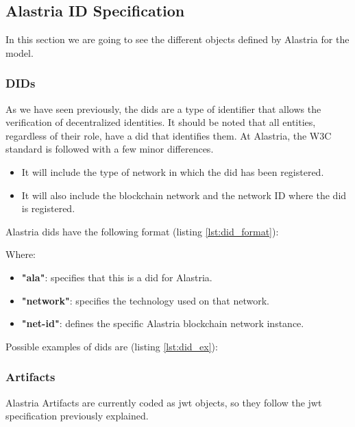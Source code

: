 \documentclass[a4paper, 12pt]{article} %
\begin{document}
    \subsection{Alastria ID Specification}
        In this section we are going to see the different objects defined by Alastria for the model.
        \subsubsection{DIDs}
            As we have seen previously, the \acrfull{did}s are a type of identifier that allows the verification of decentralized identities. It should be noted that all entities, regardless of their role, have a \acrshort{did} that identifies them. At Alastria, the W3C standard is followed with a few minor differences.
            \begin{itemize}
                \item It will include the type of network in which the \acrshort{did} has been registered.
                \item It will also include the blockchain network and the network ID where the \acrshort{did} is registered.
            \end{itemize}
            
            Alastria \acrshort{did}s have the following format (listing \ref{lst:did_format}):
            
            Where:
            \begin{itemize}
                \item \textbf{"ala"}: specifies that this is a \acrshort{did} for Alastria.
                \item \textbf{"network"}: specifies the technology used on that network. 
                \item \textbf{"net-id"}: defines the specific Alastria blockchain network instance.
            \end{itemize}
            Possible examples of \acrshort{did}s are (listing \ref{lst:did_ex}):
            

        \subsubsection{Artifacts}
            Alastria Artifacts are currently coded as \acrshort{jwt} objects, so they follow the \acrshort{jwt} specification previously explained.
            
\end{document}
